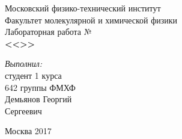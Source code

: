 \begin{titlepage}
\begin{center} 
 
\large Московский физико-технический институт\\
Факультет молекулярной и химической физики\\
\vspace{7cm}
\huge Лабораторная работа №\\
\textbf{\Large <<>>}\\
\end{center} 

\vspace{7.5cm}
{\par \raggedleft \large \emph{Выполнил:}\\ студент 1 курса\\ 642 группы ФМХФ\\ Демьянов Георгий\\ Сергеевич \par}
\begin{center}
\vfill Москва 2017
\end{center}
\end{titlepage}
\newpage
\setcounter{page}{2}